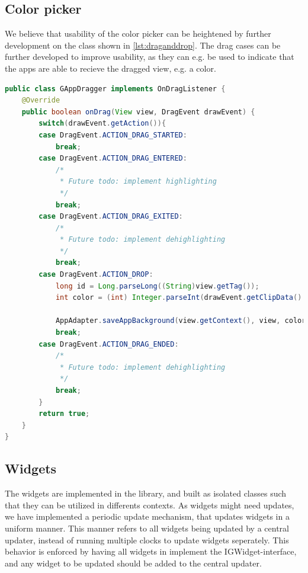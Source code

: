 \subsection{Color picker}
\label{home:colorpicker}	
We believe that usability of the color picker can be heightened by further development on the class shown in \autoref{lst:draganddrop}.
The drag cases can be further developed to improve usability, as they can e.g. be used to indicate that the apps are able to recieve the dragged view, e.g. a color.

\begin{lstlisting}[style=sourceCode, language=JAVA, caption=The GAppdragger class, label=lst:draganddrop] 
public class GAppDragger implements OnDragListener {
	@Override
	public boolean onDrag(View view, DragEvent drawEvent) {
		switch(drawEvent.getAction()){
		case DragEvent.ACTION_DRAG_STARTED:
			break;
		case DragEvent.ACTION_DRAG_ENTERED:
			/*
			 * Future todo: implement highlighting
			 */
			break;
		case DragEvent.ACTION_DRAG_EXITED:
			/*
			 * Future todo: implement dehighlighting
			 */
			break;
		case DragEvent.ACTION_DROP:
			long id = Long.parseLong((String)view.getTag());
			int color = (int) Integer.parseInt(drawEvent.getClipData().getItemAt(0).getText().toString());
			
			AppAdapter.saveAppBackground(view.getContext(), view, color, id);
			break;
		case DragEvent.ACTION_DRAG_ENDED:
			/*
			 * Future todo: implement dehighlighting
			 */
			break;
		}
		return true;
	}
}
\end{lstlisting}

\subsection{Widgets}
The widgets are implemented in the \guicomponents[] library, and built as isolated classes such that they can be utilized in differents contexts. 
As widgets might need updates, we have implemented a periodic update mechanism, that updates \giraf[] widgets in a uniform manner.
This manner refers to all widgets being updated by a central updater, instead of running multiple clocks to update widgets seperately.
This behavior is enforced by having all widgets in \giraf[] implement the IGWidget-interface, and any widget to be updated should be added to the central updater.